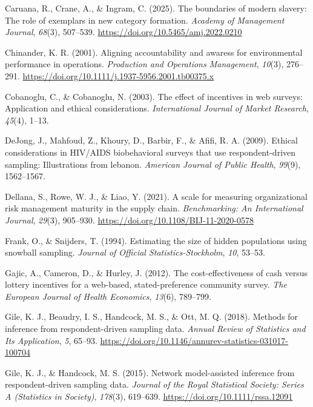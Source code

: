 \documentclass[
  12pt,
]{article}
\newlength{\cslhangindent}
\newenvironment{CSLReferences}[2] %
 {\begin{list}{}{%
  \setlength{\itemindent}{0pt}
  \setlength{\leftmargin}{0pt}
  \setlength{\parsep}{0pt}
  \ifodd #1
   \setlength{\leftmargin}{\cslhangindent}
   \setlength{\itemindent}{-1\cslhangindent}
  \fi
  \setlength{\itemsep}{#2\baselineskip}}}
 {\end{list}}
\theoremstyle{plain}
\theoremstyle{definition}
\begin{document}
\begin{CSLReferences}{1}{0}
Caruana, R., Crane, A., \& Ingram, C. (2025). The boundaries of modern
slavery: The role of exemplars in new category formation. \emph{Academy
of Management Journal}, \emph{68}(3), 507--539.
\url{https://doi.org/10.5465/amj.2022.0210}

Chinander, K. R. (2001). Aligning accountability and awaress for
environmental performance in operations. \emph{Production and Operations
Management}, \emph{10}(3), 276--291.
\url{https://doi.org/10.1111/j.1937-5956.2001.tb00375.x}

Cobanoglu, C., \& Cobanoglu, N. (2003). The effect of incentives in web
surveys: Application and ethical considerations. \emph{International
Journal of Market Research}, \emph{45}(4), 1--13.

DeJong, J., Mahfoud, Z., Khoury, D., Barbir, F., \& Afifi, R. A. (2009).
Ethical considerations in {HIV}/{AIDS} biobehavioral surveys that use
respondent-driven sampling: Illustrations from lebanon. \emph{American
Journal of Public Health}, \emph{99}(9), 1562--1567.

Dellana, S., Rowe, W. J., \& Liao, Y. (2021). A scale for measuring
organizational risk management maturity in the supply chain.
\emph{Benchmarking: An International Journal}, \emph{29}(3), 905--930.
\url{https://doi.org/10.1108/BIJ-11-2020-0578}

Frank, O., \& Snijders, T. (1994). Estimating the size of hidden
populations using snowball sampling. \emph{Journal of Official
Statistics-Stockholm}, \emph{10}, 53--53.

Gajic, A., Cameron, D., \& Hurley, J. (2012). The cost-effectiveness of
cash versus lottery incentives for a web-based, stated-preference
community survey. \emph{The European Journal of Health Economics},
\emph{13}(6), 789--799.

Gile, K. J., Beaudry, I. S., Handcock, M. S., \& Ott, M. Q. (2018).
Methods for inference from respondent-driven sampling data. \emph{Annual
Review of Statistics and Its Application}, \emph{5}, 65--93.
\url{https://doi.org/10.1146/annurev-statistics-031017-100704}

Gile, K. J., \& Handcock, M. S. (2015). Network model-assisted inference
from respondent-driven sampling data. \emph{Journal of the Royal
Statistical Society: Series A (Statistics in Society)}, \emph{178}(3),
619--639. \url{https://doi.org/10.1111/rssa.12091}


\end{CSLReferences}
\end{document}
